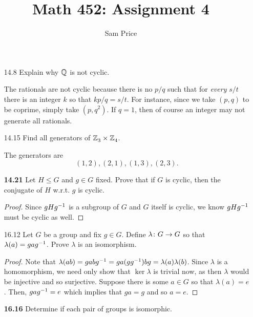 \documentclass{article}
\author{Sam Price}
\title{Math 452: Assignment 4}
\begin{document}
\maketitle

\begin{enumerate}[start=0,label={RELABEL}]
  \item[14.8\rparen] Explain why $\mathbb{Q}^{}$ is not cyclic.

        The rationals are not cyclic because there is no $p/q$ such that for \emph{every} $s/t$ there is an integer $k$ so that $kp/q = s/t$.
        For instance, since we take $(p, q)$ to be coprime, simply take $(p, q^{2})$. If $q = 1$, then of course an integer may not generate all rationals.

  \item[14.15\rparen] Find all generators of $\mathbb{Z}^{}_{3} \times \mathbb{Z}^{}_{4}$.

        The generators are
        \[ (1, 2), (2, 1), (1, 3), (2, 3). \]

  \item[\textbf{14.21}\rparen] Let $H \le G$ and $g \in G$ fixed.
        Prove that if $G$ is cyclic, then the conjugate of $H$ w.r.t. $g$ is cyclic.

        \begin{proof}
          Since $gHg^{-1}$ is a subgroup of $G$ and $G$ itself is cyclic,
          we know $gHg^{-1}$ must be cyclic as well.
        \end{proof}

  \item[16.12\rparen] Let $G$ be a group and fix $g \in G$.
        Define $\lambda \colon G \to G$ so that $\lambda(a) = gag^{-1}$. Prove $\lambda$ is an isomorphism.

        \begin{proof}
          Note that $\lambda(ab) = gabg^{-1} = ga (gg^{-1}) bg = \lambda(a)\lambda(b)$.
          Since $\lambda$ is a homomorphism, we need only show that $\ker \lambda$ is trivial now,
          as then $\lambda$ would be injective and so surjective.
          Suppose there is some $a \in G$ so that $\lambda(a) = e$.
          Then, $gag^{-1} = e$ which implies that $ga = g$ and so $a = e$.
        \end{proof}

  \item[\textbf{16.16}\rparen] Determine if each pair of groups is isomorphic.


\end{enumerate}
\end{document}
